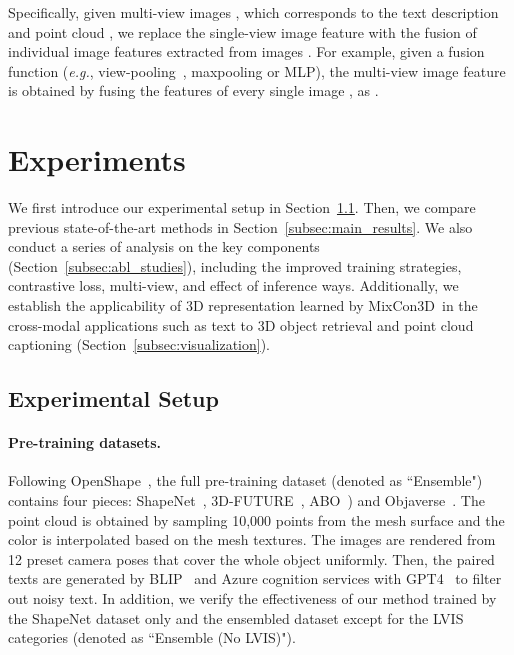 \documentclass{article} \usepackage{iclr2024_conference,times}
\newcommand{\ourmethod}{MixCon3D}
\begin{document}
Specifically, given  multi-view images , which corresponds to the text description  and point cloud , we replace the single-view image feature with the fusion of individual image features  extracted from images .
For example, given a fusion function  (\textit{e.g.}, view-pooling~\citep{MVConv}, maxpooling or MLP), the multi-view image feature  is obtained by fusing the features  of every single image , as .


\section{Experiments}
\label{sec:experiments} 
We first introduce our experimental setup in Section~\ref{sec:exp_setup}.
Then, we compare previous state-of-the-art methods in Section~\ref{subsec:main_results}.
We also conduct a series of analysis on the key components (Section~\ref{subsec:abl_studies}), including the improved training strategies, contrastive loss, multi-view, and effect of inference ways.
Additionally, we establish the applicability of 3D representation learned by \ourmethod~in the cross-modal applications such as text to 3D object retrieval and point cloud captioning (Section~\ref{subsec:visualization}).

\subsection{Experimental Setup}
\label{sec:exp_setup}
\paragraph{Pre-training datasets.}
Following OpenShape~\citep{openshape}, the full pre-training dataset (denoted as ``Ensemble") contains four pieces: ShapeNet~\citep{shapenet}, 3D-FUTURE~\citep{3d-future}, ABO~\citep{abo}) and Objaverse~\citep{objaverse}. 
The point cloud is obtained by sampling 10,000 points from the mesh surface and the color is interpolated based on the mesh textures. 
The images are rendered from 12 preset camera poses that cover the whole object uniformly.
Then, the paired texts are generated by BLIP~\citep{blip, blipv2} and Azure cognition services with GPT4~\citep{GPT4} to filter out noisy text. 
In addition, we verify the effectiveness of our method trained by the ShapeNet dataset only and the ensembled dataset except for the LVIS~\citep{lvis} categories (denoted as ``Ensemble (No LVIS)").
\end{document}
